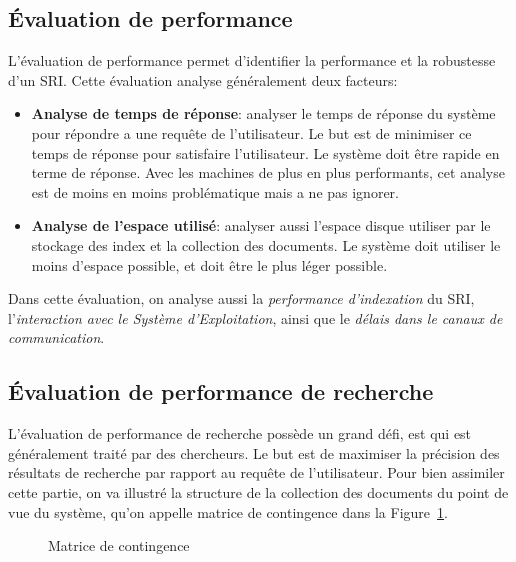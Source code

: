 \subsection{Évaluation de performance}
L'évaluation de performance permet d'identifier la performance et la robustesse d'un SRI\@. Cette évaluation analyse généralement deux facteurs:
\begin{itemize}
	\item \textbf{Analyse de temps de réponse}: analyser le temps de réponse du système pour répondre a une requête de l'utilisateur. Le but est de minimiser ce temps de réponse pour satisfaire l'utilisateur. Le système doit être rapide en terme de réponse. Avec les machines de plus en plus performants, cet analyse est de moins en moins problématique mais a ne pas ignorer.
	\item \textbf{Analyse de l’espace utilisé}: analyser aussi l'espace disque utiliser par le stockage des index et la collection des documents. Le système doit utiliser le moins d’espace possible, et doit être le plus léger possible.
\end{itemize}

Dans cette évaluation, on analyse aussi la \emph{performance d'indexation} du SRI, l’\emph{interaction avec le Système d'Exploitation}, ainsi que le \emph{délais dans le canaux de communication}.

\subsection{Évaluation de performance de recherche}
L'évaluation de performance de recherche possède un grand défi, est qui est généralement traité par des chercheurs. Le but est de maximiser la précision des résultats de recherche par rapport au requête de l'utilisateur. Pour bien assimiler cette partie, on va illustré la structure de la collection des documents du point de vue du système, qu'on appelle matrice de contingence dans la Figure~\ref{fig:matrice-contingence}.

\begin{figure}[htbp]
	\begin{center}
	\end{center}
	\caption{Matrice de contingence \citep{vsm-for-arabic-language}}\label{fig:matrice-contingence}
\end{figure}

